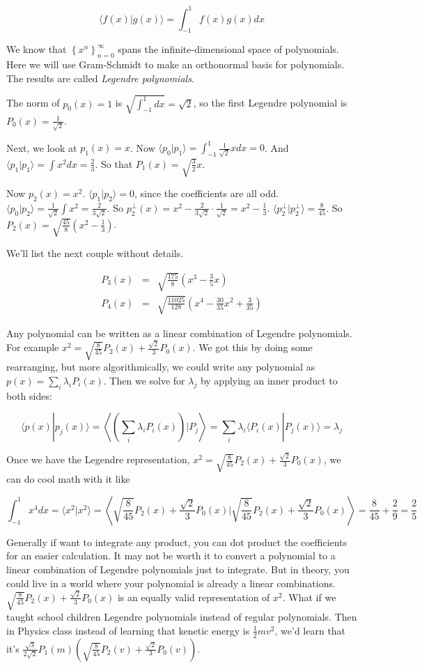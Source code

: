 \documentclass{amsbook}
\begin{document}
$$
\langle f(x)|g(x)\rangle = \int_{-1}^1f(x)g(x)dx
$$

We know that $\left\{x^n\right\}_{n=0}^\infty$ spans the infinite-dimensional space of polynomials.  Here we will use Gram-Schmidt to make an orthonormal basis for polynomials.  The results are called {\em Legendre polynomials}.

The norm of $p_0(x)=1$ is $\sqrt{\int_{-1}^1dx}=\sqrt2$, so the first Legendre polynomial is $P_0(x)=\frac{1}{\sqrt2}$.

Next, we look at $p_1(x)=x$.  Now $\langle p_0|p_1\rangle=\int_{-1}^1\frac{1}{\sqrt2}xdx=0$.  And $\langle p_1|p_1\rangle = \int x^2dx=\frac{2}{3}$.  So that $P_1(x)=\sqrt{\frac{3}{2}}x$.

Now $p_2(x)=x^2$.  $\langle p_1|p_2\rangle=0$, since the coefficients are all odd.  $\langle p_0|p_2\rangle=\frac{1}{\sqrt2}\int x^2=\frac{2}{3\sqrt2}$.  So $p_2^\bot(x)=x^2-\frac{2}{3\sqrt2}\cdot\frac{1}{\sqrt2}=x^2-\frac{1}{3}$.  $\langle p_2^\bot|p_2^\bot\rangle=\frac{8}{45}$.  So $P_2(x)=\sqrt{\frac{45}{8}}\left(x^2-\frac{1}{3}\right)$.

We'll list the next couple without details.

$$
\begin{array}{rcl}
P_3(x)&=&\sqrt{\frac{175}{8}}\left(x^3-\frac{3}{5}x\right) \\
P_4(x)&=&\sqrt{\frac{11025}{128}}\left(x^4-\frac{30}{35}x^2+\frac{3}{35}\right)
\end{array}
$$

Any polynomial can be written as a linear combination of Legendre polynomials.  For example $x^2=\sqrt{\frac{8}{45}}P_2(x)+\frac{\sqrt2}{3}P_0(x)$.  We got this by doing some rearranging, but more algorithmically, we could write any polynomial as $p(x)=\sum_i\lambda_iP_i(x)$.  Then we solve for $\lambda_j$ by applying an inner product to both sides:

$$
\langle p(x)|p_j(x)\rangle=\left\langle\left(\sum_i\lambda_iP_i(x)\right)|P_j\right\rangle=\sum_i\lambda_i\langle P_i(x)|P_j(x)\rangle=\lambda_j
$$

Once we have the Legendre representation, $x^2=\sqrt{\frac{8}{45}}P_2(x)+\frac{\sqrt2}{3}P_0(x)$, we can do cool math with it like

$$
\int_{-1}^1x^4dx=\langle x^2|x^2\rangle = \left\langle \sqrt{\frac{8}{45}}P_2(x)+\frac{\sqrt2}{3}P_0(x)|\sqrt{\frac{8}{45}}P_2(x)+\frac{\sqrt2}{3}P_0(x)\right\rangle=\frac{8}{45}+\frac{2}{9}=\frac{2}{5}
$$

Generally if want to integrate any product, you can dot product the coefficients for an easier calculation.  It may not be worth it to convert a polynomial to a linear combination of Legendre polynomials just to integrate.  But in theory, you could live in a world where your polynomial is already a linear combinations.  $\sqrt{\frac{8}{45}}P_2(x)+\frac{\sqrt2}{3}P_0(x)$ is an equally valid representation of $x^2$.  What if we taught school children Legendre polynomials instead of regular polynomials.  Then in Physics class instead of learning that kenetic energy is $\frac{1}{2}mv^2$, we'd learn that it's $\frac{\sqrt{3}}{2\sqrt2}P_1(m)\left(\sqrt{\frac{8}{45}}P_2(v)+\frac{\sqrt2}{3}P_0(v)\right)$.
\end{document}
